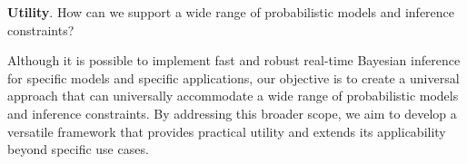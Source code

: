 \newcommand{\utilityquestion}{
  How can we support a wide range of probabilistic models and inference constraints?
}

\begin{questions}[resume]
  \item \textbf{Utility}. \utilityquestion
  \label{question:utility}
\end{questions}

Although it is possible to implement fast and robust real-time Bayesian inference for specific
models and specific applications, our objective is to create a universal approach that can universally accommodate
a wide range of probabilistic models and inference constraints.
By addressing this broader scope, we aim to develop a versatile framework that provides
practical utility and extends its applicability beyond specific use cases.

